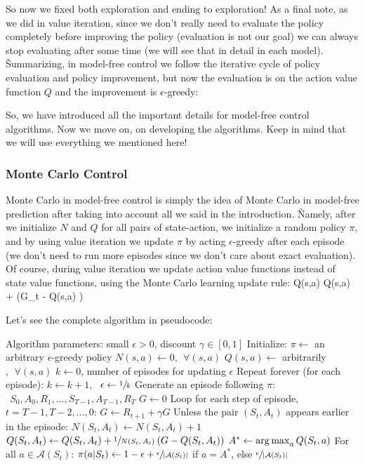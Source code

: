 So now we fixed both exploration and ending to exploration! As a final note, as we did in value iteration, since we
don't really need to evaluate the policy completely before improving the policy (evaluation is not our goal) we can
always stop evaluating after some time (we will see that in detail in each model). \v

Summarizing, in model-free control we follow the iterative cycle of policy evaluation and policy improvement, but
now the evaluation is on the action value function $Q$ and the improvement is $\epsilon$-greedy:


So, we have introduced all the important details for model-free control algorithms. Now we move on, on developing
the algorithms. Keep in mind that we will use everything we mentioned here!

\subsubsection{Monte Carlo Control}

Monte Carlo in model-free control is simply the idea of Monte Carlo in model-free prediction after taking into
account all we said in the introduction. \v

Namely, after we initialize $N$ and $Q$ for all pairs of state-action, we initialize a random policy $\pi$, and by
using value iteration we update $\pi$ by acting $\epsilon$-greedy after each episode (we don't need to run more
episodes since we don't care about exact evaluation). Of course, during value iteration we update action value
functions instead of state value functions, using the Monte Carlo learning update rule:
\bse
Q(s,a) \gets Q(s,a) +  \left(G_t - Q(s,a) \right)
\ese

Let's see the complete algorithm in pseudocode:

\begin{block}
Algorithm parameters: small $\epsilon > 0$, discount $\gamma \in [0,1]$
Initialize:
    $\pi \gets$ an arbitrary $\epsilon$-greedy policy
    $N(s,a) \gets 0, \:\: \forall (s,a)$
    $Q(s,a) \gets$ arbitrarily$, \:\: \forall (s,a)$
    $k \gets 0$, number of episodes for updating $\epsilon$
Repeat forever (for each episode):
    $k \gets k+1$, $\:\: \epsilon \gets \sfrac{1}{k}$
    Generate an episode following $\pi$: $\:\: S_0, A_0, R_1, \ldots, S_{T-1}, A_{T-1}, R_T$
    $G \gets 0$
    Loop for each step of episode, $t = T-1, T-2, \ldots, 0$:
        $G \gets R_{t+1} + \gamma G$
        Unless the pair $(S_t, A_t)$ appears earlier in the episode:
            $N(S_t, A_t) \gets N(S_t, A_t) + 1$
            $Q(S_t, A_t) \gets Q(S_t, A_t) + \sfrac{1}{N(S_t, A_t)} \: (G - Q(S_t, A_t))$
            $A^{*} \gets \operatorname*{arg\,max}_a Q(S_t, a)$
            For all $a \in \mathcal{A}(S_t)$:
                $\pi(a|S_t) \gets 1 - \epsilon + \sfrac{\epsilon}{|\mathcal{A}(S_t)|}$ if $a = A^{*}$, else $\sfrac{\epsilon}{|\mathcal{A}(S_t)|}$
\end{block}

